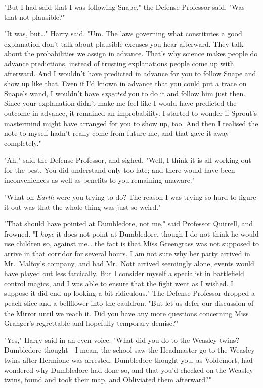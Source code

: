 "But I had said that I was following Snape," the Defense Professor said. "Was
that not plausible?"

"It was, but{\ldots}" Harry said. "Um. The laws governing what constitutes a
good explanation don't talk about plausible excuses you hear afterward. They
talk about the probabilities we assign in advance. That's why science makes
people do advance predictions, instead of trusting explanations people come up
with afterward. And I wouldn't have predicted in advance for you to follow
Snape and show up like that. Even if I'd known in advance that you could put a
trace on Snape's wand, I wouldn't have \emph{expected} you to do it and follow
him just then. Since your explanation didn't make me feel like I would have
predicted the outcome in advance, it remained an improbability. I started to
wonder if Sprout's mastermind might have arranged for you to show up, too. And
then I realised the note to myself hadn't really come from future-me, and that
gave it away completely."

"Ah," said the Defense Professor, and sighed. "Well, I think it is all working
out for the best. You did understand only too late; and there would have been
inconveniences as well as benefits to you remaining unaware."

"What on \emph{Earth} were you trying to do? The reason I was trying so hard to
figure it out was that the whole thing was just so weird."

"That should have pointed at Dumbledore, not me," said Professor Quirrell, and
frowned. "I \emph{hope} it does not point at Dumbledore, though I do not think
he would use children so, against me{\ldots} the fact is that Miss Greengrass
was not supposed to arrive in that corridor for several hours. I am not sure
why her party arrived in Mr.~Malfoy's company, and had Mr.~Nott arrived
seemingly alone, events would have played out less farcically. But I consider
myself a specialist in battlefield control magics, and I was able to ensure
that the fight went as I wished. I suppose it did end up looking a bit
ridiculous." The Defense Professor dropped a peach slice and a bellflower into
the cauldron. "But let us defer our discussion of the Mirror until we reach it.
Did you have any more questions concerning Miss Granger's regrettable and
hopefully temporary demise?"

"Yes," Harry said in an even voice. "What did you do to the Weasley twins?
Dumbledore thought---I mean, the school saw the Headmaster go to the Weasley
twins after Hermione was arrested. Dumbledore thought you, as Voldemort, had
wondered why Dumbledore had done so, and that you'd checked on the Weasley
twins, found and took their map, and Obliviated them afterward?"

